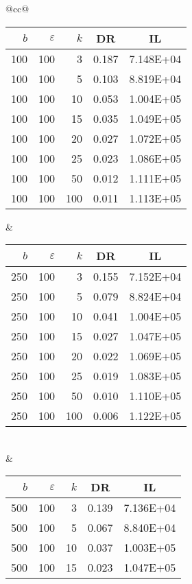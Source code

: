 \begin{table}[H]
	\centering
	\begin{tabular}{@{}cc@{}}
		\begin{tabular}{@{}rrrrr@{}}
			\toprule
			$b$ & $\varepsilon$ & $k$ & \multicolumn{1}{c}{DR} & \multicolumn{1}{c}{IL} \\ \midrule
			100 & 100 & 3   & 0.187 & 7.148E+04 \\
			100 & 100 & 5   & 0.103 & 8.819E+04 \\
			100 & 100 & 10  & 0.053 & 1.004E+05 \\
			100 & 100 & 15  & 0.035 & 1.049E+05 \\
			100 & 100 & 20  & 0.027 & 1.072E+05 \\
			100 & 100 & 25  & 0.023 & 1.086E+05 \\
			100 & 100 & 50  & 0.012 & 1.111E+05 \\
			100 & 100 & 100 & 0.011 & 1.113E+05 \\ \bottomrule
		\end{tabular}
		&
		\begin{tabular}{@{}rrrrr@{}}
			\toprule
			$b$ & $\varepsilon$ & $k$ & \multicolumn{1}{c}{DR} & \multicolumn{1}{c}{IL} \\ \midrule
			250 & 100 &  3   & 0.155 & 7.152E+04 \\
			250 & 100 &  5   & 0.079 & 8.824E+04 \\
			250 & 100 &  10  & 0.041 & 1.004E+05 \\
			250 & 100 &  15  & 0.027 & 1.047E+05 \\
			250 & 100 &  20  & 0.022 & 1.069E+05 \\
			250 & 100 &  25  & 0.019 & 1.083E+05 \\
			250 & 100 &  50  & 0.010 & 1.110E+05 \\
			250 & 100 &  100 & 0.006 & 1.122E+05 \\ \bottomrule
		\end{tabular}
		\\ & \\
		\begin{tabular}{@{}rrrrr@{}}
			\toprule
			$b$ & $\varepsilon$ & $k$ & \multicolumn{1}{c}{DR} & \multicolumn{1}{c}{IL} \\ \midrule
			500 & 100 & 3   & 0.139 & 7.136E+04 \\
			500 & 100 & 5   & 0.067 & 8.840E+04 \\
			500 & 100 & 10  & 0.037 & 1.003E+05 \\
			500 & 100 & 15  & 0.023 & 1.047E+05 \\

\end{tabular}
\end{tabular}
\end{table}
